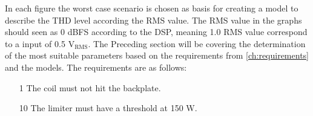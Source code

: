 In each figure the worst case scenario is chosen as basis for creating a model to describe the THD level according the RMS value. The RMS value in the graphs should seen as 0 dBFS according to the DSP, meaning 1.0 RMS value correspond to a input of 0.5 $\text{V}_\text{RMS}$. The Preceding section will be covering the determination of the most suitable parameters based on the requirements from \autoref{ch:requirements} and the models. The requirements are as follows:

\begin{enumerate}
\item[1] The coil must not hit the backplate.
\item[10] The limiter must have a threshold at 150 W.
\end{enumerate}









%

%